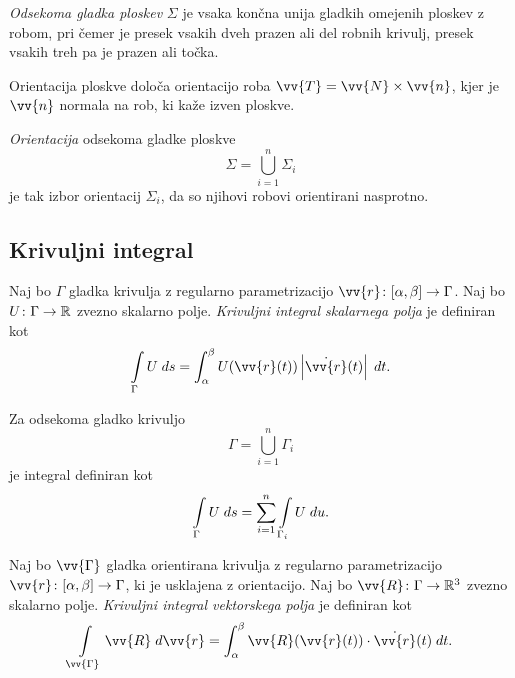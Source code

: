 \begin{definicija}
\emph{Odsekoma gladka ploskev}
$\Sigma$ je vsaka končna unija gladkih omejenih ploskev z robom,
pri čemer je presek vsakih dveh prazen ali del robnih krivulj,
presek vsakih treh pa je prazen ali točka.
\end{definicija}

\begin{opomba}
Orientacija ploskve določa orientacijo roba
$\vv{T} = \vv{N} \times \vv{n}$, kjer je $\vv{n}$ normala na rob,
ki kaže izven ploskve.
\end{opomba}

\begin{definicija}
\emph{Orientacija} odsekoma gladke ploskve
\[
\Sigma = \bigcup_{i=1}^n \Sigma_i
\]
je tak izbor orientacij $\Sigma_i$, da so njihovi robovi
orientirani nasprotno.
\end{definicija}

\newpage

\subsection{Krivuljni integral}

\begin{definicija}
Naj bo $\Gamma$ gladka krivulja z regularno parametrizacijo
$\vv{r} \colon [\alpha, \beta] \to \Gamma$. Naj bo
$U \colon \Gamma \to \mathbb{R}$ zvezno skalarno polje.
\emph{Krivuljni integral skalarnega polja}
je definiran kot
\[
\lint_\Gamma U\;ds =
\int_\alpha^\beta U(\vv{r}(t)) \abs{\dot{\vv{r}}(t)}\;dt.
\]
\end{definicija}

\begin{opomba}
Za odsekoma gladko krivuljo
\[
\Gamma = \bigcup_{i=1}^n \Gamma_i
\]
je integral definiran kot
\[
\int\limits_\Gamma U\;ds =
\sum_{i=1}^n \int\limits_{\Gamma_i} U\;du.
\]
\end{opomba}

\begin{definicija}
Naj bo $\vv{\Gamma}$ gladka orientirana krivulja z regularno
parametrizacijo $\vv{r} \colon [\alpha, \beta] \to \Gamma$, ki je
usklajena z orientacijo. Naj bo $\vv{R} \colon \Gamma \to \R^3$
zvezno skalarno polje. \emph{Krivuljni integral vektorskega polja}
je definiran kot
\[
\lint_{\vv{\Gamma}} \vv{R}\;d\vv{r} =
\int_\alpha^\beta \vv{R}(\vv{r}(t)) \cdot \dot{\vv{r}}(t)\;dt.
\]
\end{definicija}

